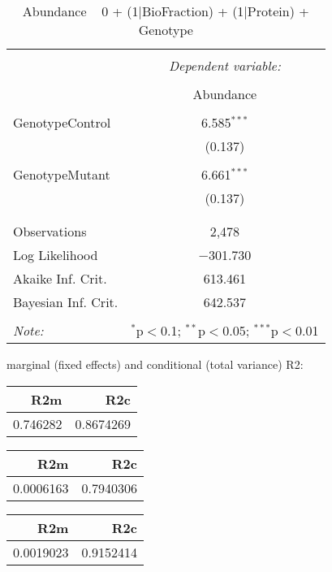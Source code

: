 \documentclass[11pt]{report}
\begin{document}
\begin{table}[!htbp] \centering 
  \caption{Abundance ~ 0 + (1|BioFraction) + (1|Protein) + Genotype} 
  \label{} 
\begin{tabular}{@{\extracolsep{5pt}}lc} 
\\[-1.8ex]\hline 
\hline \\[-1.8ex] 
 & \multicolumn{1}{c}{\textit{Dependent variable:}} \\ 
\cline{2-2} 
\\[-1.8ex] & Abundance \\ 
\hline \\[-1.8ex] 
 GenotypeControl & 6.585$^{***}$ \\ 
  & (0.137) \\ 
  & \\ 
 GenotypeMutant & 6.661$^{***}$ \\ 
  & (0.137) \\ 
  & \\ 
\hline \\[-1.8ex] 
Observations & 2,478 \\ 
Log Likelihood & $-$301.730 \\ 
Akaike Inf. Crit. & 613.461 \\ 
Bayesian Inf. Crit. & 642.537 \\ 
\hline 
\hline \\[-1.8ex] 
\textit{Note:}  & \multicolumn{1}{r}{$^{*}$p$<$0.1; $^{**}$p$<$0.05; $^{***}$p$<$0.01} \\ 
\end{tabular} 
\end{table} 
marginal (fixed effects) and conditional (total variance) R2:

\begin{tabular}{r|r}
\hline
R2m & R2c\\
\hline
0.746282 & 0.8674269\\
\hline
\end{tabular}

\begin{tabular}{r|r}
\hline
R2m & R2c\\
\hline
0.0006163 & 0.7940306\\
\hline
\end{tabular}

\begin{tabular}{r|r}
\hline
R2m & R2c\\
\hline
0.0019023 & 0.9152414\\
\hline
\end{tabular}
\end{document}
